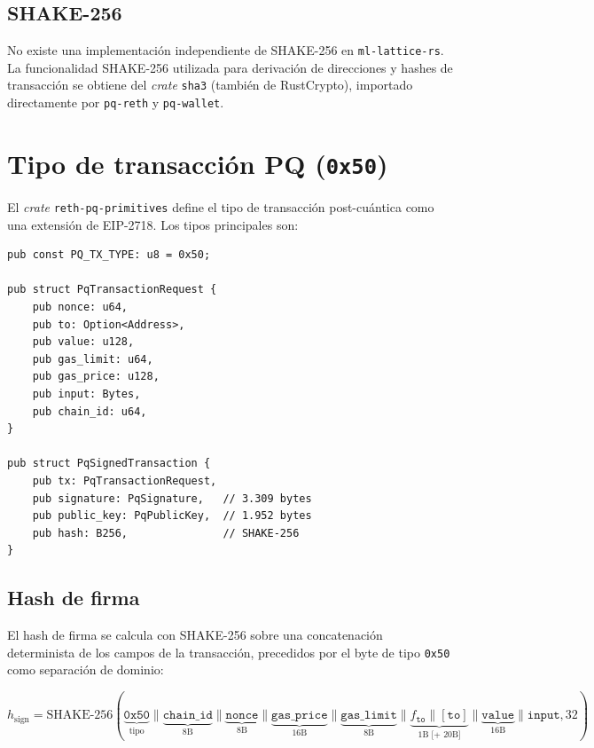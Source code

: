 \subsection{SHAKE-256}

No existe una implementación independiente de SHAKE-256 en \texttt{ml-lattice-rs}. La funcionalidad SHAKE-256 utilizada para derivación de direcciones y hashes de transacción se obtiene del \emph{crate} \texttt{sha3} (también de RustCrypto), importado directamente por \texttt{pq-reth} y \texttt{pq-wallet}.


\section{Tipo de transacción PQ (\texttt{0x50})}
\label{sec:dev_tx}

El \emph{crate} \texttt{reth-pq-primitives} define el tipo de transacción post-cuántica como una extensión de EIP-2718. Los tipos principales son:

\begin{lstlisting}[style=rustcode, caption={Tipos de transacción PQ.}, label={lst:pq_tx_types}]
pub const PQ_TX_TYPE: u8 = 0x50;

pub struct PqTransactionRequest {
    pub nonce: u64,
    pub to: Option<Address>,
    pub value: u128,
    pub gas_limit: u64,
    pub gas_price: u128,
    pub input: Bytes,
    pub chain_id: u64,
}

pub struct PqSignedTransaction {
    pub tx: PqTransactionRequest,
    pub signature: PqSignature,   // 3.309 bytes
    pub public_key: PqPublicKey,  // 1.952 bytes
    pub hash: B256,               // SHAKE-256
}
\end{lstlisting}

\subsection{Hash de firma}

El hash de firma se calcula con SHAKE-256 sobre una concatenación determinista de los campos de la transacción, precedidos por el byte de tipo \texttt{0x50} como separación de dominio:

\begin{equation}
  h_{\text{sign}} = \text{SHAKE-256}(
    \underbrace{\texttt{0x50}}_{\text{tipo}} \|
    \underbrace{\texttt{chain\_id}}_{\text{8B}} \|
    \underbrace{\texttt{nonce}}_{\text{8B}} \|
    \underbrace{\texttt{gas\_price}}_{\text{16B}} \|
    \underbrace{\texttt{gas\_limit}}_{\text{8B}} \|
    \underbrace{f_{\texttt{to}} \| [\texttt{to}]}_{\text{1B [+ 20B]}} \|
    \underbrace{\texttt{value}}_{\text{16B}} \|
    \texttt{input}
  , 32)
\end{equation}

